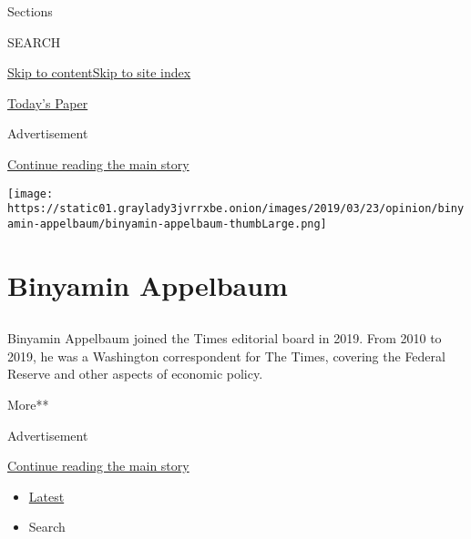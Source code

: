 Sections

SEARCH

\protect\hyperlink{site-content}{Skip to
content}\protect\hyperlink{site-index}{Skip to site index}

\href{https://myaccount.nytimes3xbfgragh.onion/auth/login?response_type=cookie\&client_id=vi}{}

\href{https://www.nytimes3xbfgragh.onion/section/todayspaper}{Today's
Paper}

Advertisement

\protect\hyperlink{after-top}{Continue reading the main story}

\texttt{[image: https://static01.graylady3jvrrxbe.onion/images/2019/03/23/opinion/binyamin-appelbaum/binyamin-appelbaum-thumbLarge.png]}

\hypertarget{binyamin-appelbaum}{%
\section{Binyamin Appelbaum}\label{binyamin-appelbaum}}

\subsection{}

Binyamin Appelbaum joined the Times editorial board in 2019. From 2010
to 2019, he was a Washington correspondent for The Times, covering the
Federal Reserve and other aspects of economic policy.~

More**

Advertisement

\protect\hyperlink{after-mid1}{Continue reading the main story}

\begin{itemize}
\tightlist
\item
  \protect\hyperlink{stream-panel}{Latest}
\item
  Search
\end{itemize}

